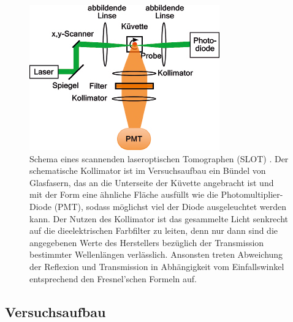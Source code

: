 \begin{figure}
	\centering
\includegraphics[width=0.8\linewidth]{IMAGE/slot_schema.png}
	\caption{Schema eines scannenden laseroptischen Tomographen (SLOT) \cite{slot_paper}. 
	Der schematische Kollimator ist im Versuchsaufbau ein Bündel von Glasfasern, das an die Unterseite der Küvette angebracht ist und mit der Form eine ähnliche Fläche ausfüllt wie die Photomultiplier-Diode (PMT), sodass möglichst viel der Diode ausgeleuchtet werden kann.
	Der Nutzen des Kollimator ist das gesammelte Licht senkrecht auf die dieelektrischen Farbfilter zu leiten, denn nur dann sind die angegebenen Werte des Herstellers bezüglich der Transmission bestimmter Wellenlängen verlässlich. Ansonsten treten Abweichung der Reflexion und Transmission in Abhängigkeit vom Einfallswinkel entsprechend den Fresnel'schen Formeln auf.}
	\label{fig:schema}
\end{figure} 


\subsection{Versuchsaufbau}

